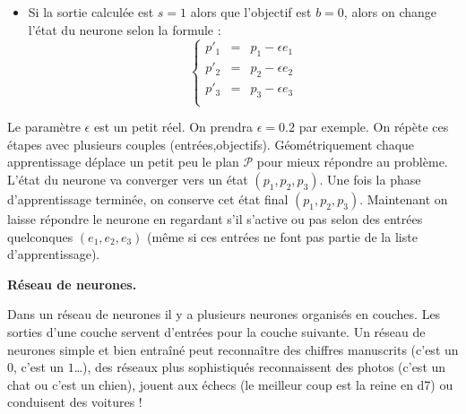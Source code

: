 \documentclass[11pt,class=report,crop=false]{standalone}
\begin{document}
\begin{cours}[Neurone]
\begin{itemize}
	\item Si la sortie calculée est $s=1$ alors que l'objectif est $b=0$, alors on change l'état du neurone selon la formule :
$$\left\{ 
\begin{array}{rcl}
p'_1 &=& p_1 - \epsilon e_1 \\
p'_2 &=& p_2 - \epsilon e_2 \\
p'_3 &=& p_3 - \epsilon e_3 \\
\end{array}
\right.$$
\end{itemize}

Le paramètre $\epsilon$ est un petit réel. On prendra $\epsilon = 0.2$ par exemple.
On répète ces étapes avec plusieurs couples (entrées,objectifs). Géométriquement chaque apprentissage déplace un petit peu le plan $\mathcal{P}$ pour mieux répondre au problème. L'état du neurone va converger vers un état $(p_1,p_2,p_3)$. 
Une fois la phase d'apprentissage terminée, on conserve cet état final $(p_1,p_2,p_3)$. Maintenant 
on laisse répondre le neurone en regardant s'il s'active ou pas selon des entrées quelconques $(e_1,e_2,e_3)$ (même si ces entrées ne font pas partie de la liste d'apprentissage).


\medskip
\textbf{Réseau de neurones.}

Dans un réseau de neurones il y a plusieurs neurones organisés en couches. Les sorties d'une couche servent d'entrées pour la couche suivante. Un réseau de neurones simple et bien entraîné peut reconnaître des chiffres manuscrits (c'est un $0$, c'est un $1$\ldots), des réseaux plus sophistiqués reconnaissent des photos (c'est un chat ou c'est un chien), jouent aux échecs (le meilleur coup est
la reine en d7) ou conduisent des voitures !


\end{cours}
\end{document}
